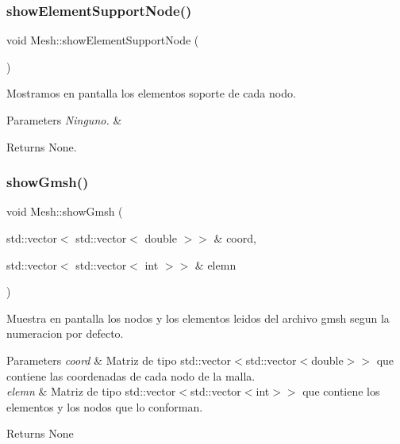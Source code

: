 \subsubsection{\texorpdfstring{show\+Element\+Support\+Node()}{showElementSupportNode()}}
{\footnotesize\ttfamily void Mesh\+::show\+Element\+Support\+Node (\begin{DoxyParamCaption}{ }\end{DoxyParamCaption})}



Mostramos en pantalla los elementos soporte de cada nodo. 


\begin{DoxyParams}{Parameters}
{\em Ninguno.} & \\
\hline
\end{DoxyParams}
\begin{DoxyReturn}{Returns}
None. 
\end{DoxyReturn}
\hypertarget{class_mesh_ab390b1e1292e0236b1a3d35c6b738228}{}\label{class_mesh_ab390b1e1292e0236b1a3d35c6b738228} 
\subsubsection{\texorpdfstring{show\+Gmsh()}{showGmsh()}}
{\footnotesize\ttfamily void Mesh\+::show\+Gmsh (\begin{DoxyParamCaption}\item[{std\+::vector$<$ std\+::vector$<$ double $>$$>$ \&}]{coord,  }\item[{std\+::vector$<$ std\+::vector$<$ int $>$$>$ \&}]{elemn }\end{DoxyParamCaption})}



Muestra en pantalla los nodos y los elementos leidos del archivo gmsh segun la numeracion por defecto. 


\begin{DoxyParams}{Parameters}
{\em coord} & Matriz de tipo std\+::vector$<$std\+::vector$<$double$>$$>$ que contiene las coordenadas de cada nodo de la malla. \\
\hline
{\em elemn} & Matriz de tipo std\+::vector$<$std\+::vector$<$int$>$$>$ que contiene los elementos y los nodos que lo conforman. \\
\hline
\end{DoxyParams}
\begin{DoxyReturn}{Returns}
None 
\end{DoxyReturn}
\hypertarget{class_mesh_aeca4f92ea58c7c4f87e33df91ac33574}{}\label{class_mesh_aeca4f92ea58c7c4f87e33df91ac33574} 
